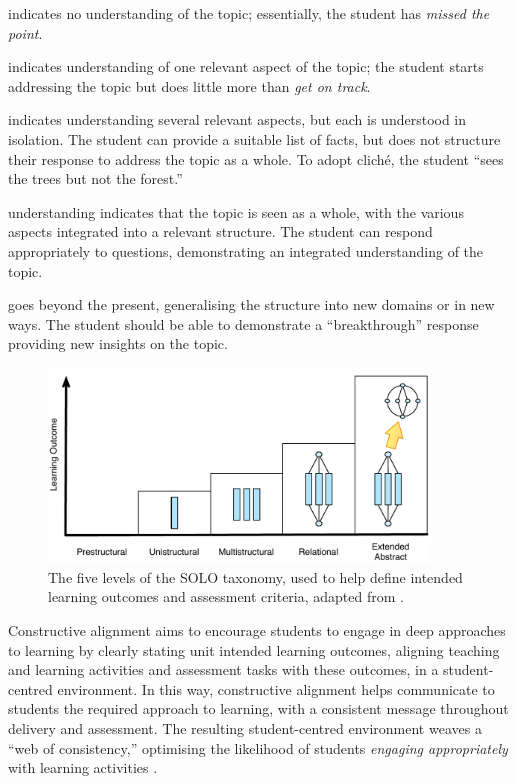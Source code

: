 \begin{description}
 	\item[Prestructural] indicates no understanding of the topic; essentially, the student has \emph{missed the point}.
 	\item[Unistructural] indicates understanding of one relevant aspect of the topic; the student starts addressing the topic but does little more than \emph{get on track}.
 	\item[Multistructural] indicates understanding several relevant aspects, but each is understood in isolation. The student can provide a suitable list of facts, but does not structure their response to address the topic as a whole. To adopt clich\'{e}, the student ``sees the trees but not the forest.''
 	\item[Relational] understanding indicates that the topic is seen as a whole, with the various aspects integrated into a relevant structure. The student can respond appropriately to questions, demonstrating an integrated understanding of the topic.
 	\item[Extended Abstract] goes beyond the present, generalising the structure into new domains or in new ways. The student should be able to demonstrate a ``breakthrough'' response providing new insights on the topic.
\end{description} 

\begin{figure}[htbp]
	\centering
	\includegraphics[width=0.9\textwidth]{SOLO}
	\caption{The five levels of the SOLO taxonomy, used to help define intended learning outcomes and assessment criteria, adapted from \citet{Biggs:2007}.}
	\label{fig:solo}
\end{figure}

Constructive alignment aims to encourage students to engage in deep approaches to learning by clearly stating unit intended learning outcomes, aligning teaching and learning activities and assessment tasks with these outcomes, in a student-centred environment. In this way, constructive alignment helps communicate to students the required approach to learning, with a consistent message throughout delivery and assessment. The resulting student-centred environment weaves a ``web of consistency,'' optimising the likelihood of students \emph{engaging appropriately} with learning activities \cite{Biggs:1999}.

